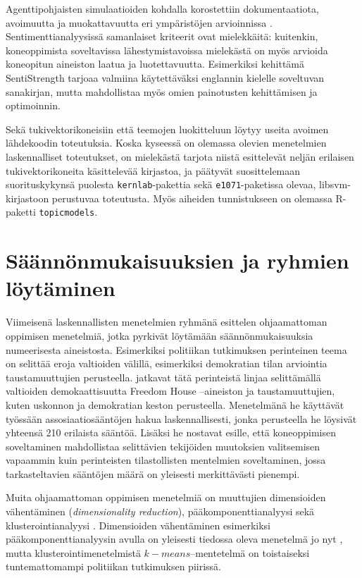 \documentclass[finnish,gradu,twoside,12pt]{tktltiki}
\begin{document}
{Agenttipohjaisten simulaatioiden kohdalla korostettiin dokumentaatiota, avoimuutta ja muokattavuutta eri ympäristöjen arvioinnissa \citep{Tobias2004}. Sentimenttianalyysissä samanlaiset kriteerit ovat mielekkäitä: kuitenkin, koneoppimista soveltavissa lähestymistavoissa mielekästä on myös arvioida koneopitun aineiston laatua ja luotettavuutta. Esimerkiksi \citet{Thelwall2010} kehittämä SentiStrength tarjoaa valmiina käytettäväksi englannin kielelle soveltuvan sanakirjan, mutta mahdollistaa myös omien painotusten kehittämisen ja optimoinnin.

Sekä tukivektorikoneisiin että teemojen luokitteluun löytyy useita avoimen lähdekoodin toteutuksia. Koska kyseessä on olemassa olevien menetelmien laskennalliset toteutukset, on mielekästä tarjota niistä  \citet{hornik2006support} esittelevät neljän erilaisen tukivektorikoneita käsittelevää kirjastoa, ja päätyvät suosittelemaan suorituskykynsä puolesta \texttt{kernlab}-pakettia sekä \texttt{e1071}-paketissa olevaa, libsvm-kirjastoon perustuvaa toteutusta. Myös aiheiden tunnistukseen on olemassa R-paketti \texttt{topicmodels}.

\section{Säännönmukaisuuksien ja ryhmien löytäminen}
\label{unsupervised}

Viimeisenä laskennallisten menetelmien ryhmänä esittelen ohjaamattoman oppimisen menetelmiä, jotka pyrkivät löytämään säännönmukaisuuksia numeerisesta aineistosta. Esimerkiksi politiikan tutkimuksen perinteinen teema on selittää eroja valtioiden välillä, esimerkiksi demokratian tilan arviointia taustamuuttujien perusteella. \citet{Jurek2013} jatkavat tätä perinteistä linjaa selittämällä valtioiden demokaattisuutta Freedom House --aineiston ja taustamuuttujien, kuten uskonnon ja demokratian keston perusteella. Menetelmänä he käyttävät työssään assosiaatiosääntöjen hakua laskennallisesti, jonka perusteella he löysivät yhteensä 210 erilaista sääntöä. Lisäksi he nostavat esille, että koneoppimisen soveltaminen mahdollistaa selittävien tekijöiden muutoksien valitsemisen vapaammin kuin perinteisten tilastollisten mentelmien soveltaminen, jossa tarkasteltavien sääntöjen määrä on yleisesti merkittävästi pienempi.

Muita ohjaamattoman oppimisen menetelmiä on muuttujien dimensioiden vähentäminen (\textit{dimensionality reduction}), pääkomponenttianalyysi sekä klusterointianalyysi \citet[485--586]{Hastie2009}. Dimensioiden vähentäminen esimerkiksi pääkomponenttianalyysin avulla on yleisesti tiedossa oleva menetelmä jo nyt \citep[esimerkiksi][615--651]{metsamuuronen}, mutta klusterointimenetelmistä $k-means$--mentetelmä on toistaiseksi tuntemattomampi politiikan tutkimuksen piirissä.

}
\end{document}
